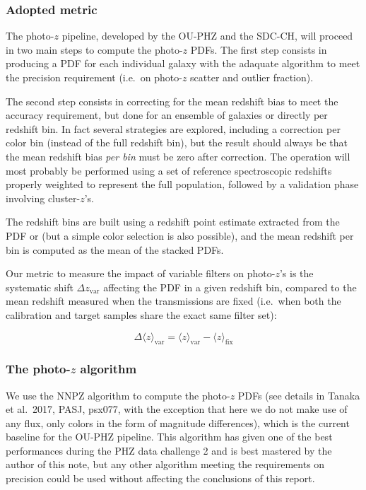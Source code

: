 \documentclass{article}
\begin{document}
\hypertarget{adopted-metric}{%
\subsubsection{Adopted metric}\label{adopted-metric}}

The photo-\(z\) pipeline, developed by the OU-PHZ and the SDC-CH, will
proceed in two main steps to compute the photo-\(z\) PDFs. The first
step consists in producing a PDF for each individual galaxy with the
adaquate algorithm to meet the precision requirement (i.e.~on
photo-\(z\) scatter and outlier fraction).

The second step consists in correcting for the mean redshift bias to
meet the accuracy requirement, but done for an ensemble of galaxies or
directly per redshift bin. In fact several strategies are explored,
including a correction per color bin (instead of the full redshift bin),
but the result should always be that the mean redshift bias \emph{per
bin} must be zero after correction. The operation will most probably be
performed using a set of reference spectroscopic redshifts properly
weighted to represent the full population, followed by a validation
phase involving cluster-\(z\)'s.

The redshift bins are built using a redshift point estimate extracted
from the PDF or (but a simple color selection is also possible), and the
mean redshift per bin is computed as the mean of the stacked PDFs.

Our metric to measure the impact of variable filters on photo-\(z\)'s is
the systematic shift \(\Delta z_\mathrm{var}\) affecting the PDF in a
given redshift bin, compared to the mean redshift measured when the
transmissions are fixed (i.e.~when both the calibration and target
samples share the exact same filter set):

    \begin{equation}
\Delta \langle z \rangle _\mathrm{var} = \langle z \rangle_\mathrm{var}- \langle z \rangle_\mathrm{fix}
\end{equation}

    \hypertarget{the-photo-z-algorithm}{%
\subsubsection{\texorpdfstring{The photo-\(z\)
algorithm}{The photo-z algorithm}}\label{the-photo-z-algorithm}}

We use the NNPZ algorithm to compute the photo-\(z\) PDFs (see details
in Tanaka et al.~2017, PASJ, psx077, with the exception that here we do
not make use of any flux, only colors in the form of magnitude
differences), which is the current baseline for the OU-PHZ pipeline.
This algorithm has given one of the best performances during the PHZ
data challenge 2 and is best mastered by the author of this note, but
any other algorithm meeting the requirements on precision could be used
without affecting the conclusions of this report.
\end{document}
